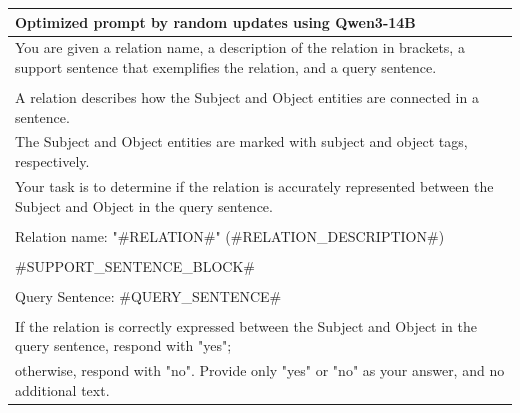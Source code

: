 \documentclass[12pt]{article}
\begin{document}
\begin{table}[h]
\begin{tabular}{l}
\midrule
Optimized prompt by random updates using Qwen3-14B\\
\midrule
You are given a relation name, a description of the relation in brackets, a support sentence that exemplifies the relation, and a query sentence.\\
\\
A relation describes how the Subject and Object entities are connected in a sentence. \\
The Subject and Object entities are marked with subject and object tags, respectively. \\
Your task is to determine if the relation is accurately represented between the Subject and Object in the query sentence.\\
\\
Relation name: "\#RELATION\#" (\#RELATION\_DESCRIPTION\#)\\
\\
\#SUPPORT\_SENTENCE\_BLOCK\#\\
\\
Query Sentence: \#QUERY\_SENTENCE\#\\
\\
If the relation is correctly expressed between the Subject and Object in the query sentence, respond with "yes"; \\
otherwise, respond with "no". Provide only "yes" or "no" as your answer, and no additional text.\\


\end{tabular}
\end{table}
\end{document}
